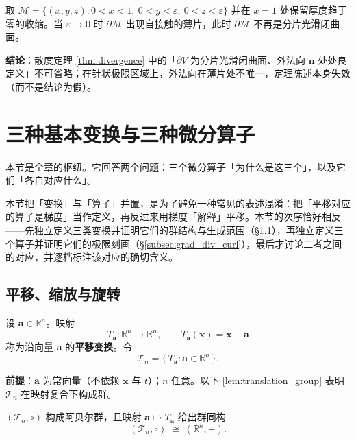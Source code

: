 \begin{example}\label{ex:needle_domain}
取 $\mathcal{M} = \{(x,y,z) : 0<x<1,\ 0<y<\varepsilon,\ 0<z<\varepsilon\}$ 并在 $x=1$ 处保留厚度趋于零的收缩。当 $\varepsilon \to 0$ 时 $\partial\mathcal M$ 出现自接触的薄片，此时 $\partial \mathcal M$ 不再是分片光滑闭曲面。

\textbf{结论}：散度定理 \cref{thm:divergence} 中的「$\partial V$ 为分片光滑闭曲面、外法向 $\mathbf n$ 处处良定义」不可省略；在针状极限区域上，外法向在薄片处不唯一，定理陈述本身失效（而不是结论为假）。
\end{example}

\section{三种基本变换与三种微分算子}\label{sec:trans_scale_rotate}

本节是全章的枢纽。它回答两个问题：三个微分算子「为什么是这三个」，以及它们「各自对应什么」。

\begin{remark}[本节在两节之间的位置]
本节把「变换」与「算子」并置，是为了避免一种常见的表述混淆：把「平移对应的算子是梯度」当作定义，再反过来用梯度「解释」平移。本节的次序恰好相反——先独立定义三类变换并证明它们的群结构与生成范围（\S\ref{subsec:trans_scale_rotate}），再独立定义三个算子并证明它们的极限刻画（\S\ref{subsec:grad_div_curl}），最后才讨论二者之间的对应，并逐档标注该对应的确切含义。
\end{remark}

\subsection{平移、缩放与旋转}\label{subsec:trans_scale_rotate}

\begin{definition}[平移变换与平移群]\label{def:translation_map}
设 $\mathbf{a} \in \mathbb{R}^n$。映射
\[
T_{\mathbf{a}}: \mathbb{R}^n \to \mathbb{R}^n, \qquad T_{\mathbf{a}}(\mathbf{x}) = \mathbf{x} + \mathbf{a}
\]
称为沿向量 $\mathbf{a}$ 的\textbf{平移变换}。令
\[
\mathcal{T}_n = \{\, T_{\mathbf{a}} : \mathbf{a} \in \mathbb{R}^n \,\}.
\]

\textbf{前提}：$\mathbf a$ 为常向量（不依赖 $\mathbf x$ 与 $t$）；$n$ 任意。以下 \cref{lem:translation_group} 表明 $\mathcal T_n$ 在映射复合下构成群。
\end{definition}

\begin{lemma}[平移群的群结构]\label{lem:translation_group}
$(\mathcal{T}_n, \circ)$ 构成阿贝尔群，且映射 $\mathbf{a} \mapsto T_{\mathbf{a}}$ 给出群同构
\[
(\mathcal{T}_n, \circ) \;\cong\; (\mathbb{R}^n, +).
\]
\end{lemma}

